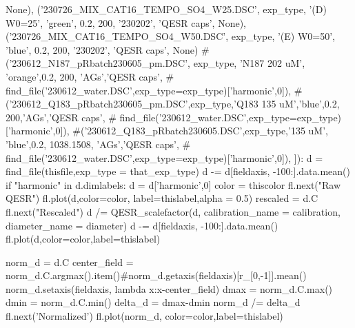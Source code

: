 \begin{python}
                    None),
               ('230726_MIX_CAT16_TEMPO_SO4_W25.DSC', exp_type, '(D) W0=25', 'green', 0.2, 200, '230202', 'QESR caps',
                    None), 
               ('230726_MIX_CAT16_TEMPO_SO4_W50.DSC', exp_type, '(E) W0=50', 'blue', 0.2, 200, '230202', 'QESR caps',
                    None)
              #('230612_N187_pRbatch230605_pm.DSC', exp_type, 'N187 202 uM', 'orange',0.2, 200, 'AGs','QESR caps',
               #   find_file('230612_water.DSC',exp_type=exp_type)['harmonic',0]),
              #('230612_Q183_pRbatch230605_pm.DSC',exp_type,'Q183 135 uM','blue',0.2, 200,'AGs','QESR caps',
               #   find_file('230612_water.DSC',exp_type=exp_type)['harmonic',0]),
              #('230612_Q183_pRbatch230605.DSC',exp_type,'135 uM', 'blue',0.2, 1038.1508, 'AGs','QESR caps',
              #    find_file('230612_water.DSC',exp_type=exp_type)['harmonic',0]),
             ]):
        d = find_file(thisfile,exp_type = that_exp_type)
        d -= d[fieldaxis, -100:].data.mean()
        if "harmonic" in d.dimlabels:
            d = d['harmonic',0]
        color = thiscolor
        fl.next("Raw QESR")
        fl.plot(d,color=color, label=thislabel,alpha = 0.5)
        rescaled = d.C
        fl.next("Rescaled")
        d /= QESR_scalefactor(d, calibration_name = calibration,
                diameter_name = diameter)
        d -= d[fieldaxis, -100:].data.mean()
        fl.plot(d,color=color,label=thislabel)
        
        norm_d = d.C
        center_field = norm_d.C.argmax().item()#norm_d.getaxis(fieldaxis)[r_[0,-1]].mean()
        norm_d.setaxis(fieldaxis, lambda x:x-center_field)
        dmax = norm_d.C.max()
        dmin = norm_d.C.min()
        delta_d = dmax-dmin
        norm_d /= delta_d
        fl.next('Normalized')
        fl.plot(norm_d, color=color,label=thislabel)
\end{python}